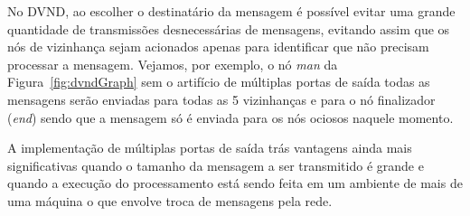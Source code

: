 No DVND, ao escolher o destinatário da mensagem é possível evitar uma grande quantidade de transmissões desnecessárias de mensagens, evitando assim que os nós de vizinhança sejam acionados apenas para identificar que não precisam processar a mensagem.
Vejamos, por exemplo, o nó \textit{man} da Figura~\ref{fig:dvndGraph} sem o artifício de múltiplas portas de saída todas as mensagens serão enviadas para todas as 5 vizinhanças e para o nó finalizador (\textit{end}) sendo que a mensagem só é enviada para os nós ociosos naquele momento.

A implementação de múltiplas portas de saída trás vantagens ainda mais significativas quando o tamanho da mensagem a ser transmitido é grande e quando a execução do processamento está sendo feita em um ambiente de mais de uma máquina o que envolve troca de mensagens pela rede.
